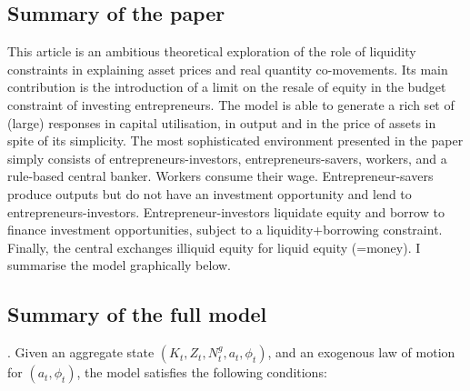 \documentclass{amsart}
\theoremstyle{definition}
\theoremstyle{remark}
\numberwithin{equation}{section}
\begin{document}
\subsection*{Summary of the paper} This article is an ambitious theoretical exploration of the role of liquidity constraints in explaining asset prices and real quantity co-movements. Its main contribution is the introduction of a limit on the resale of equity in the budget constraint of investing entrepreneurs. The model is able to generate a rich set of (large) responses in capital utilisation, in output and in the price of assets in spite of its simplicity. The most sophisticated environment presented in the paper simply consists of entrepreneurs-investors, entrepreneurs-savers, workers, and a rule-based central banker. Workers consume their wage. Entrepreneur-savers produce outputs but do not have an investment opportunity and lend to entrepreneurs-investors. Entrepreneur-investors liquidate equity and borrow to finance investment opportunities, subject to a liquidity+borrowing constraint. Finally, the central exchanges illiquid equity for liquid equity (=money). I summarise the model graphically below.

\subsection*{Summary of the full model}. Given an aggregate state $\left(K_{t}, Z_{t}, N_{t}^{g}, a_{t}, \phi_{t}\right)$, and an exogenous law of motion for $\left(a_{t}, \phi_{t}\right)$, the model satisfies the following conditions:
\end{document}
